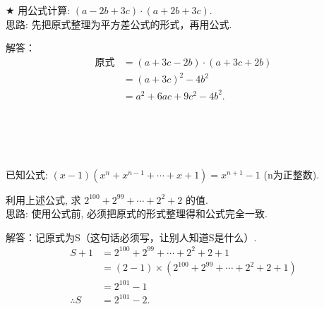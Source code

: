\begin{comment}
\item {
    多项式 $4a^2+9$ 加上一个单项式后, 可化为一个多项式的平方, 求这个单项式. 
    \\ \\ \\
}
\end{comment}

\begin{comment}
\item {
    已知 $a^2+a-1=0$, 求 $a^3 + 2a^2 + 2023$ 的值. 
    \\ \\ \\
}
\end{comment}

\item {
    $\bigstar$
    用公式计算: $(a-2b+3c)\cdot (a+2b+3c)$. 
    \ifshowSolution
    \fangsong{}
    \\
    思路: 先把原式整理为平方差公式的形式，再用公式. 

    解答：
    \begin{align*}
        \mbox{原式} &= (a+3c-2b)\cdot (a+3c+2b) \\
        &= (a+3c)^2 - 4b^2 \\
        &= a^2 + 6ac + 9c^2 - 4b^2. \\
    \end{align*}

    \else
        \\ \\ \\
    \fi
}

\item {
    已知公式: $(x-1)(x^n + x^{n-1} + \cdots + x + 1) = x^{n+1} - 1$ (n为正整数). 
    
    利用上述公式, 求 $2^{100} + 2^{99} +\cdots + 2^2 + 2$ 的值. 
    \ifshowSolution
        \fangsong{}
        \\
        思路: 使用公式前, 必须把原式的形式整理得和公式完全一致. 

        解答：记原式为S（这句话必须写，让别人知道S是什么）. 
        \begin{align*}
            S + 1 &= 2^{100} + 2^{99} + \cdots + 2^2 + 2 + 1 \\
            &= (2-1)\times (2^{100} + 2^{99} + \cdots + 2^2 + 2 + 1) \\
            &= 2^{101} - 1 \\
            \therefore
            S &= 2^{101} - 2. 
        \end{align*}
    \else
        \\ \\ \\
    \fi
}

